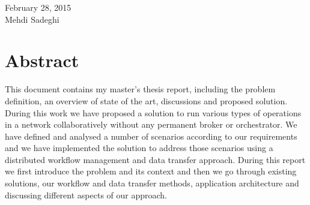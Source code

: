 \documentclass[12pt, a4paper, oneside]{report}
\begin{document}
February 28, 2015 \\

Mehdi Sadeghi

\chapter*{Abstract}
This document contains my master's thesis report, including the problem definition,
an overview of state of the art, discussions and proposed solution.
During this work we have proposed a solution to run various types of operations in a network collaboratively without any permanent broker or orchestrator. 
We have defined and analysed a number of scenarios according to our requirements 
and we have implemented the solution to address those scenarios using a distributed workflow management and data transfer approach. 
During this report we first introduce the problem and its context and then we go through existing solutions,
our workflow and data transfer methods, application architecture and discussing different aspects of our approach.


\tableofcontents



%







%


\printbibliography[heading=bibintoc, title={References}]
\end{document}
